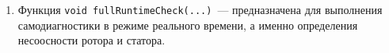 \begin{enumerate}
\begin{enumerate}
        \item Функция \verb|void fullRuntimeCheck(...)|~--- предназначена для выполнения самодиагностики в режиме реального времени, а именно определения несоосности ротора и статора.
    \end{enumerate}
\end{enumerate}
